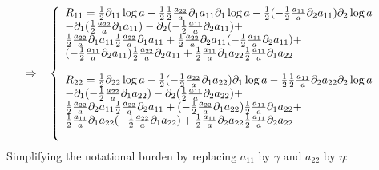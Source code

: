  \begin{align}
 \Rightarrow\quad &\left \{ \begin{array}{l}
 R_{11} =  \frac{1}{2}\partial_{11} \log a - \frac{1}{2} \frac{1}{2}\frac{a_{22}}{a}\partial_1 a_{11}\partial_1 \log a- \frac{1}{2} (- \frac{1}{2}\frac{a_{11}}{a}\partial_2 a_{11})\partial_2 \log a \\
 -\partial_1(\frac{1}{2}\frac{a_{22}}{a}\partial_1 a_{11})-\partial_2(- \frac{1}{2}\frac{a_{11}}{a}\partial_2 a_{11}) + 
 \\ \frac{1}{2}\frac{a_{22}}{a}\partial_1 a_{11}\frac{1}{2}\frac{a_{22}}{a}\partial_1 a_{11}+ \frac{1}{2}\frac{a_{22}}{a}\partial_2 a_{11}(- \frac{1}{2}\frac{a_{11}}{a}\partial_2 a_{11})+ \\
 (- \frac{1}{2}\frac{a_{11}}{a}\partial_2 a_{11})\frac{1}{2}\frac{a_{22}}{a}\partial_2 a_{11}+ \frac{1}{2}\frac{a_{11}}{a}\partial_1 a_{22}\frac{1}{2}\frac{a_{11}}{a}\partial_1 a_{22}\\\\
  R_{22} =  \frac{1}{2}\partial_{22} \log a - \frac{1}{2} (- \frac{1}{2}\frac{a_{22}}{a}\partial_1 a_{22})\partial_1 \log a- \frac{1}{2} \frac{1}{2}\frac{a_{11}}{a}\partial_2 a_{22}\partial_2 \log a \\
 -\partial_1(- \frac{1}{2}\frac{a_{22}}{a}\partial_1 a_{22})-\partial_2(\frac{1}{2}\frac{a_{11}}{a}\partial_2 a_{22}) + 
 \\ \frac{1}{2}\frac{a_{22}}{a}\partial_2 a_{11}\frac{1}{2}\frac{a_{22}}{a}\partial_2 a_{11}+ (- \frac{1}{2}\frac{a_{22}}{a}\partial_1 a_{22})\frac{1}{2}\frac{a_{11}}{a}\partial_1 a_{22}+ \\
 \frac{1}{2}\frac{a_{11}}{a}\partial_1 a_{22}(- \frac{1}{2}\frac{a_{22}}{a}\partial_1 a_{22})+ \frac{1}{2}\frac{a_{11}}{a}\partial_2 a_{22}\frac{1}{2}\frac{a_{11}}{a}\partial_2 a_{22}\\\\
 \end {array}\right.
 \end{align}
 Simplifying the notational burden by  replacing $a_{11}$ by $\gamma$ and $a_{22}$ by $\eta$:
